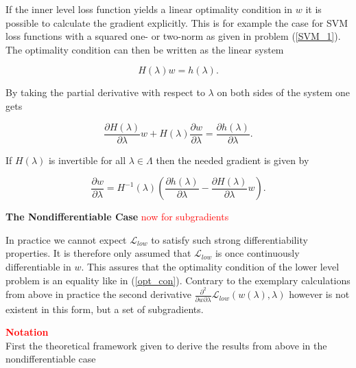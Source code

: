 If the inner level loss function yields a linear optimality condition in \(w\) it is possible to calculate the gradient explicitly. This is for example the case for SVM loss functions with a squared one- or two-norm as given in problem (\ref{SVM_1}).
The optimality condition can then be written as the linear system

\begin{equation*}
	H(\lambda)w = h(\lambda).
\end{equation*}

By taking the partial derivative with respect to \(\lambda\) on both sides of the system one gets

\begin{equation*}
	\frac{\partial H(\lambda)}{\partial \lambda}w+H(\lambda)\frac{\partial w}{\partial \lambda} = \frac{\partial h(\lambda)}{\partial  \lambda}.
\end{equation*}

If \(H(\lambda)\) is invertible for all \(\lambda \in \Lambda\) then the needed gradient is given by 

\begin{equation*}
	\frac{\partial w}{\partial \lambda} = H^{-1}(\lambda)\left(\frac{\partial h(\lambda)}{\partial \lambda}-\frac{\partial H(\lambda)}{\partial \lambda}w\right).
\end{equation*}


\textbf{The Nondifferentiable Case}
\textcolor{red}{now for subgradients}

In practice we cannot expect \(\mathcal{L}_{low}\) to satisfy such strong differentiability properties.
It is therefore only assumed that \(\mathcal{L}_{low}\) is once continuously differentiable in \(w\). This assures that the optimality condition of the lower level problem is an equality like in (\ref{opt_con}).
Contrary to the exemplary calculations from above in practice the second derivative \(\frac{\partial^2}{\partial w \partial \lambda} \mathcal{L}_{low}(w(\lambda),\lambda)\) however is not existent in this form, but a set of subgradients.



\textcolor{red}{\textbf{Notation}}\\
First the theoretical framework given to derive the results from above in the nondifferentiable case



